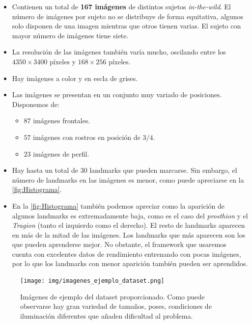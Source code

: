         \begin{itemize}
            \item Contienen un total de \textbf{167 imágenes} de distintos sujetos \textit{in-the-wild}. El número de imágenes por sujeto no se distribuye de forma equitativa, algunos solo disponen de una imagen mientras que otros tienen varias. El sujeto con mayor número de imágenes tiene siete.
            \item La resolución de las imágenes también varía mucho, oscilando entre los $4350 \times 3400$ píxeles y $168 \times 256$ píxeles.
            \item Hay imágenes a color y en escla de grises.
            \item Las imágenes se presentan en un conjunto muy variado de posiciones. Disponemos de: 
            \begin{itemize}
                \item $87$ imágenes frontales.
                \item $57$ imágenes con rostros en posición de \textbf{$3/4$}.
                \item $23$ imágenes de perfil.
            \end{itemize}
            \item Hay hasta un total de $30$ landmarks que pueden marcarse. Sin embargo, el número de landmarks en las imágenes es menor, como puede apreciarse en la \autoref{fig:Histograma}.
            \item En la \autoref{fig:Histograma} también podemos apreciar como la aparición de algunos landmarks es extremadamente baja, como es el caso del \textit{prosthion} y el \textit{Tragion} (tanto el izquierdo como el derecho). El resto de landmarks aparecen en más de la mitad de las imágenes. Los landmarks que más aparecen son los que  pueden aprenderse mejor. No obstante, el framework que usaremos cuenta con excelentes datos de rendimiento entrenando con pocas imágenes, por lo que los landmarks con menor aparición también pueden ser aprendidos.
        \end{itemize}
            \begin{figure}[H]
                \centering
                \texttt{[image: img/imagenes\_ejemplo\_dataset.png]}
                \caption{Imágenes de ejemplo del dataset proporcionado. Como puede observarse hay gran variedad de tamaños, poses, condiciones de iluminación diferentes que añaden dificultad al problema.}
                \label{fig:Imagenes_dataset}
            \end{figure}

